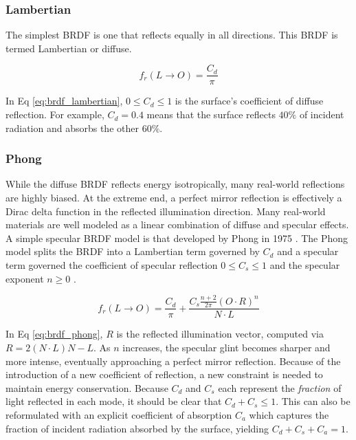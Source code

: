 \subsubsection{Lambertian}

The simplest BRDF is one that reflects equally in all directions. This BRDF is termed Lambertian or diffuse.

\begin{equation} \label{eq:brdf_lambertian}
  f_r(L \rightarrow O) = \frac{C_d}{\pi}
\end{equation}

In Eq \ref{eq:brdf_lambertian}, $0 \leq C_d \leq 1$ is the surface's coefficient of diffuse reflection. For example, $C_d = 0.4$ means that the surface reflects $40\%$ of incident radiation and absorbs the other $60\%$. 

\subsubsection{Phong}

While the diffuse BRDF reflects energy isotropically, many real-world reflections are highly biased. At the extreme end, a perfect mirror reflection is effectively a Dirac delta function in the reflected illumination direction. Many real-world materials are well modeled as a linear combination of diffuse and specular effects. A simple specular BRDF model is that developed by Phong in 1975 \cite{phong1975}. The Phong model splits the BRDF into a Lambertian term governed by $C_d$ and a specular term governed the coefficient of specular reflection $ 0 \leq C_s \leq 1$ and the specular exponent $n \geq 0$ \cite{duvenhage2013}. 

\begin{equation} \label{eq:brdf_phong}
  f_r(L \rightarrow O) = \frac{C_d}{\pi} + \frac{C_s \frac{n+2}{2\pi} (O \cdot R)^n}{N \cdot L}
\end{equation}

In Eq \ref{eq:brdf_phong}, $R$ is the reflected illumination vector, computed via $R = 2 (N \cdot L) N - L$. As $n$ increases, the specular glint becomes sharper and more intense, eventually approaching a perfect mirror reflection. Because of the introduction of a new coefficient of reflection, a new constraint is needed to maintain energy conservation. Because $C_d$ and $C_s$ each represent the \textit{fraction} of light reflected in each mode, it should be clear that $C_d + C_s \leq 1$. This can also be reformulated with an explicit coefficient of absorption $C_a$ which captures the fraction of incident radiation absorbed by the surface, yielding $C_d + C_s + C_a = 1$. 

